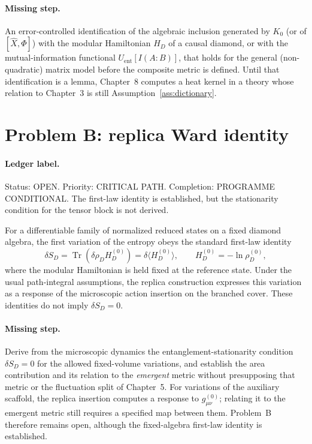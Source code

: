 \paragraph{Missing step.}
An error-controlled identification of the algebraic inclusion generated
by \(K_0\) (or of \([\hat X,\Phi]\)) with the modular Hamiltonian \(H_D\)
of a causal diamond, or with the mutual-information functional
\(U_{\mathrm{ent}}[I(A:B)]\), that holds for the general (non-quadratic)
matrix model before the composite metric is defined. Until that
identification is a lemma, Chapter~8 computes a heat kernel in a theory
whose relation to Chapter~3 is still Assumption~\ref{ass:dictionary}.

\section{Problem B: replica Ward identity}
\label{sec:status-B}

\paragraph{Ledger label.}
Status: OPEN. Priority: CRITICAL PATH. Completion:
PROGRAMME CONDITIONAL. The first-law identity is established, but
the stationarity condition for the tensor block is not derived.

For a differentiable family of normalized reduced states on a fixed
diamond algebra, the first variation of the entropy obeys the standard
first-law identity
\[
\delta S_D
=
\operatorname{Tr}(\delta\rho_D H_D^{(0)})
=
\delta\langle H_D^{(0)}\rangle,
\qquad
H_D^{(0)}=-\ln\rho_D^{(0)},
\]
where the modular Hamiltonian is held fixed at the reference state.
Under the usual path-integral assumptions, the replica construction
expresses this variation as a response of the microscopic action
insertion on the branched cover. These identities do not imply
\(\delta S_D=0\).

\paragraph{Missing step.}
Derive from the microscopic dynamics the entanglement-stationarity
condition \(\delta S_D=0\) for the allowed fixed-volume variations,
and establish the area contribution and its relation to the
\emph{emergent} metric without presupposing that metric or the
fluctuation split of Chapter~5. For variations of the auxiliary
scaffold, the replica insertion computes a response to
\(g^{(0)}_{\mu\nu}\); relating it to the emergent metric still
requires a specified map between them. Problem~B therefore remains
open, although the fixed-algebra first-law identity is established.

